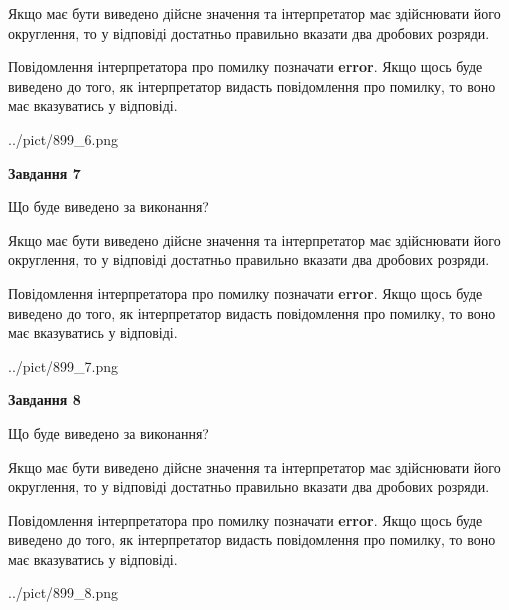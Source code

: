 \documentclass[12pt, ukrainian]{article}
\begin{document}
{\begin {Large}
Якщо має бути виведено дійсне значення та інтерпретатор має здійснювати його округлення, 
то у відповіді достатньо правильно вказати два дробових розряди.

Повідомлення інтерпретатора про помилку позначати \textbf{error}.
Якщо щось буде виведено до того, як інтерпретатор видасть повідомлення про помилку, 
то воно має вказуватись у відповіді. \par

\begin{center}
	{../pict/899_6.png}
\end{center}
\newpage

{\begin {center}\textbf{Завдання 7}\end {center}}\par
Що буде виведено за виконання? \par

Якщо має бути виведено дійсне значення та інтерпретатор має здійснювати його округлення, 
то у відповіді достатньо правильно вказати два дробових розряди.

Повідомлення інтерпретатора про помилку позначати \textbf{error}.
Якщо щось буде виведено до того, як інтерпретатор видасть повідомлення про помилку, 
то воно має вказуватись у відповіді. \par

\begin{center}
	{../pict/899_7.png}
\end{center}
\newpage

{\begin {center}\textbf{Завдання 8}\end {center}}\par
Що буде виведено за виконання? \par

Якщо має бути виведено дійсне значення та інтерпретатор має здійснювати його округлення, 
то у відповіді достатньо правильно вказати два дробових розряди.

Повідомлення інтерпретатора про помилку позначати \textbf{error}.
Якщо щось буде виведено до того, як інтерпретатор видасть повідомлення про помилку, 
то воно має вказуватись у відповіді. \par

\begin{center}
	{../pict/899_8.png}
\end{center}
\newpage


\end{Large}}
\end{document}
